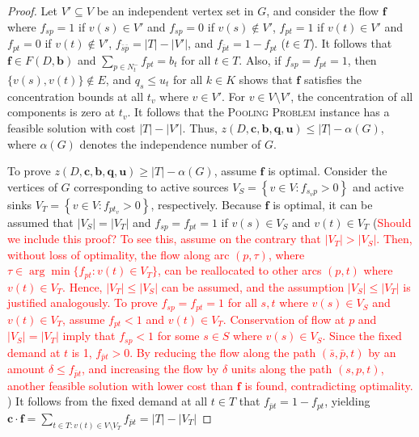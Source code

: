 \documentclass[pdflatex,sn-mathphys-num]{sn-jnl}%
\theoremstyle{thmstyleone}%
\begin{document}
\begin{proof}
Let $V'\subseteq V$ be an independent vertex set in $G$, and consider the flow $\boldsymbol{f}$ where
$f_{sp}=1$ if $v(s)\in V'$ and $f_{sp}=0$ if $v(s)\notin V'$,
$f_{pt}=1$ if $v(t)\in V'$ and $f_{pt}=0$ if $v(t)\notin V'$,
$f_{\bar{s}\bar{p}}=|T|-|V'|$, and $f_{\bar{p}t}=1-f_{pt}$ ($t\in T$).
It follows that $\boldsymbol{f}\in F(D,\boldsymbol{b})$ and $\sum_{p\in N_t^-}f_{pt}=b_t$ for all $t\in T$.
Also, if $f_{sp}=f_{pt}=1$, then $\{v(s),v(t)\}\notin E$, and $q_s\leq u_t$ for all $k\in K$ shows that
$\boldsymbol{f}$ satisfies the concentration bounds at all $t_v$ where $v\in V'$.
For $v\in V\setminus V'$, the concentration of all components is zero at $t_v$.
It follows that the \textsc{Pooling Problem} instance has a feasible solution with cost $|T|-|V'|$.
Thus, $z(D,\boldsymbol{c},\boldsymbol{b},\boldsymbol{q},\boldsymbol{u})\leq |T|-\alpha(G)$,
where $\alpha(G)$ denotes the independence number of $G$.

To prove $z(D,\boldsymbol{c},\boldsymbol{b},\boldsymbol{q},\boldsymbol{u})\geq |T|-\alpha(G)$,
assume $\boldsymbol{f}$ is optimal.
Consider the vertices of $G$ corresponding to active sources $V_S = \left\{v\in V: f_{s_vp}>0\right\}$ and active sinks
$V_T = \left\{v\in V: f_{pt_v}>0\right\}$, respectively.
Because $\boldsymbol{f}$ is optimal, it can be assumed that $|V_S|=|V_T|$ and $f_{sp}=f_{pt}=1$ if $v(s)\in V_S$ and $v(t)\in V_T$
(\textcolor{red}{Should we include this proof? To see this, assume on the contrary that $|V_T|>|V_S|$.
Then, without loss of optimality, the flow along arc $(p,\tau)$, where $\tau\in\arg\min\{f_{pt}: v(t)\in V_T\}$,
can be reallocated to other arcs $(p,t)$ where $v(t)\in V_T$.
Hence, $|V_T|\leq|V_S|$ can be assumed, and the assumption $|V_S|\leq|V_T|$ is justified analogously.
To prove $f_{sp}=f_{pt}=1$ for all $s,t$ where $v(s)\in V_S$ and $v(t)\in V_T$, assume $f_{pt}<1$ and $v(t)\in V_T$.
Conservation of flow at $p$ and $|V_S|=|V_T|$ imply that $f_{sp}<1$ for some $s\in S$ where $v(s)\in V_S$.
Since the fixed demand at $t$ is 1, $f_{\bar{p}t}>0$.
By reducing the flow along the path $(\bar{s},\bar{p},t)$ by an amount $\delta\leq f_{\bar{p}t}$, 
and increasing the flow by $\delta$ units along the path $(s,p,t)$,
another feasible solution with lower cost than $\boldsymbol{f}$ is found, contradicting optimality.
})
It follows from the fixed demand at all $t\in T$ that $f_{\bar{p}t}=1-f_{pt}$,
yielding $\boldsymbol{c}\cdot\boldsymbol{f}=\sum_{t\in T:v(t)\in V\setminus V_T}f_{\bar{p}t}=|T|-|V_T|$


\end{proof}
\end{document}
